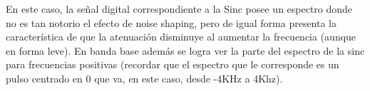 \documentclass[assd_tp3_main.tex]{subfiles}
\begin{document}
En este caso, la señal digital correspondiente a la Sinc posee un espectro donde no es tan notorio el efecto de noise shaping, pero de igual forma presenta la característica de que la atenuación disminuye al aumentar la frecuencia (aunque en forma leve). En banda base además se logra ver la parte del espectro de la sinc para frecuencias positivas (recordar que el espectro que le corresponde es un pulso centrado en 0 que va, en este caso, desde -4KHz a 4Khz).
\end{document}
